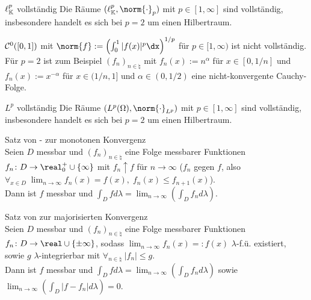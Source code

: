 \begin{Satz}{$\ell^p_{\mathbb{K}}$ vollständig}
    Die Räume $(\ell^p_\KK, \norm{\cdot}_p)$ mit $p \in [1, \infty]$
    sind vollständig, insbesondere handelt es sich bei $p = 2$ um einen Hilbertraum.
\end{Satz}

\linie
\pagebreak

\begin{Bem}
    $\mathcal{C}^0([0, 1])$ mit $\norm{f} := \left(\int_0^1 |f(x)|^p \dx\right)^{1/p}$ für $p \in [1, \infty)$
    ist nicht vollständig.\\
    Für $p = 2$ ist zum Beispiel $(f_n)_{n \in \natural}$ mit $f_n(x) := n^\alpha$ für
    $x \in [0, 1/n]$ und $f_n(x) := x^{-\alpha}$ für $x \in (1/n, 1]$ und $\alpha \in (0, 1/2)$
    eine nicht-konvergente Cauchy-Folge.
\end{Bem}

\begin{Satz}{$L^p$ vollständig}
    Die Räume $(L^p(\Omega), \norm{\cdot}_{L^p})$ mit $p \in [1, \infty]$
    sind vollständig, insbesondere handelt es sich bei $p = 2$ um einen Hilbertraum.
\end{Satz}

\begin{Satz}{Satz von - zur monotonen Konvergenz}\\
    Seien $D$ messbar und $(f_n)_{n \in \natural}$ eine Folge messbarer Funktionen
    $f_n\colon D \rightarrow \real_0^+ \cup \{\infty\}$ mit $f_n \uparrow f$ für $n \to \infty$
    ($f_n$  gegen $f$, also
    $\forall_{x \in D}\; \lim_{n \to \infty} f_n(x) = f(x),\; f_n(x) \le f_{n+1}(x)$).\\
    Dann ist $f$ messbar und
    $\int_D f d\lambda = \lim_{n \to \infty} \left(\int_D f_n d\lambda\right)$.
\end{Satz}

\begin{Satz}{Satz von  zur majorisierten Konvergenz}\\
    Seien $D$ messbar und $(f_n)_{n \in \natural}$ eine Folge messbarer Funktionen
    $f_n\colon D \rightarrow \real \cup \{\pm\infty\}$, sodass
    $\lim_{n \to \infty} f_n(x) =: f(x)$ $\lambda$-f.ü. existiert, sowie
    $g$ $\lambda$-integrierbar mit $\forall_{n \in \natural}\; |f_n| \le g$.\\
    Dann ist $f$ messbar und
    $\int_D f d\lambda = \lim_{n \to \infty} \left(\int_D f_n d\lambda\right)$ sowie
    $\lim_{n \to \infty} \left(\int_D |f - f_n| d\lambda\right) = 0$.
\end{Satz}

